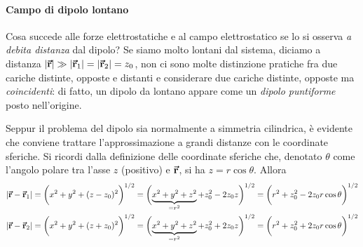 \paragraph{Campo di dipolo lontano}
Cosa succede alle forze elettrostatiche e al campo elettrostatico se lo si osserva \textit{a debita distanza} dal dipolo? Se siamo molto lontani dal sistema, diciamo a distanza $\abs{\vb*{\va{r}}}\gg\abs{\vb*{\va{r}}_1}=\abs{\vb*{\va{r}}_2}=z_0$, non ci sono molte distinzione pratiche fra due cariche distinte, opposte e distanti e considerare due cariche distinte, opposte ma \textit{coincidenti}: di fatto, un dipolo da lontano appare come un \textit{dipolo puntiforme} posto nell'origine.

Seppur il problema del dipolo sia normalmente a simmetria cilindrica, è evidente che conviene trattare l'approssimazione a grandi distanze con le coordinate sferiche.
Si ricordi dalla definizione delle coordinate sferiche che, denotato $\theta$ come l'angolo polare tra l'asse $z$ (positivo) e $\vb*{\va{r}}$, si ha $z=r\cos\theta$. Allora
\begin{gather*}
	\abs{\vb*{\va{r}}-\vb*{\va{r}}_1}=\biggl(x^2+y^2+(z-z_0)^2\biggr)^{1/2}=\biggl(\underbrace{x^2+y^2+z^2}_{=r^2}+z_0^2-2z_0z\biggr)^{1/2}=\biggl(r^2+z_0^2-2z_0r\cos\theta\biggr)^{1/2}\\
	\abs{\vb*{\va{r}}-\vb*{\va{r}}_2}=\biggl(x^2+y^2+(z+z_0)^2\biggr)^{1/2}=\biggl(\underbrace{x^2+y^2+z^2}_{=r^2}+z_0^2+2z_0z\biggr)^{1/2}=\biggl(r^2+z_0^2+2z_0r\cos\theta\biggr)^{1/2}
\end{gather*}
